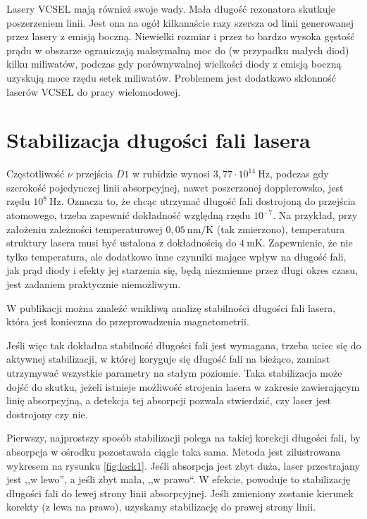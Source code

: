 \documentclass[a4paper,10pt,twoside]{report}
\begin{document}
Lasery VCSEL mają również swoje wady. Mała długość rezonatora skutkuje poszerzeniem linii. Jest ona na ogół kilkanaście razy szersza od linii generowanej przez lasery z emisją boczną. Niewielki rozmiar i przez to bardzo wysoka gęstość prądu w obszarze ograniczają maksymalną moc do (w przypadku małych diod) kilku miliwatów, podczas gdy porównywalnej wielkości diody z emisją boczną uzyskują moce rzędu setek miliwatów. Problemem jest dodatkowo skłonność laserów VCSEL do pracy wielomodowej.


\section{Stabilizacja długości fali lasera}

Częstotliwość $\nu$ przejścia $D1$ w rubidzie wynosi $3{,}77 \cdot 10^{14}~
\mathrm{Hz}$, podczas gdy szerokość pojedynczej linii absorpcyjnej,
nawet poszerzonej dopplerowsko, jest rzędu $10^8~\mathrm{Hz}$. Oznacza to, że 
chcąc utrzymać długość fali dostrojoną do przejścia atomowego,
trzeba zapewnić dokładność względną rzędu $10^{-7}$. Na przykład, przy założeniu zależności temperaturowej $0{,}05 ~\mathrm{nm/K}$ (tak zmierzono), temperatura struktury lasera musi być ustalona z dokładnością do $4~\mathrm{mK}$. Zapewnienie,
że nie tylko temperatura, ale dodatkowo inne czynniki mające wpływ na długość fali, jak prąd diody i efekty jej 
starzenia się, będą niezmienne przez długi okres czasu, jest zadaniem 
praktycznie niemożliwym.

W publikacji \cite{sensitivity} można znaleźć wnikliwą analizę stabilności długości fali lasera, która jest konieczna do przeprowadzenia magnetometrii. 

Jeśli więc tak dokładna stabilność długości fali jest wymagana, trzeba uciec się do aktywnej 
stabilizacji, w której koryguje się długość fali na bieżąco, zamiast utrzymywać 
wszystkie parametry na stałym poziomie.
Taka stabilizacja może dojść do skutku, jeżeli istnieje możliwość strojenia 
lasera w zakresie zawierającym linię absorpcyjną, a detekcja tej absorpcji pozwala stwierdzić, czy laser jest dostrojony czy nie.

Pierwszy, najprostszy sposób stabilizacji polega na takiej korekcji długości 
fali, by absorpcja w ośrodku pozostawała ciągle taka sama.
Metoda jest zilustrowana wykresem na rysunku \ref{fig:lock1}. Jeśli absorpcja 
jest zbyt duża, laser przestrajany jest ,,w lewo'', a jeśli zbyt mała, ,,w 
prawo``.
W efekcie, powoduje to stabilizację długości fali do lewej strony linii absorpcyjnej.
Jeśli zmieniony zostanie kierunek korekty (z lewa na prawo), uzyskamy stabilizację do prawej strony linii.
\end{document}
